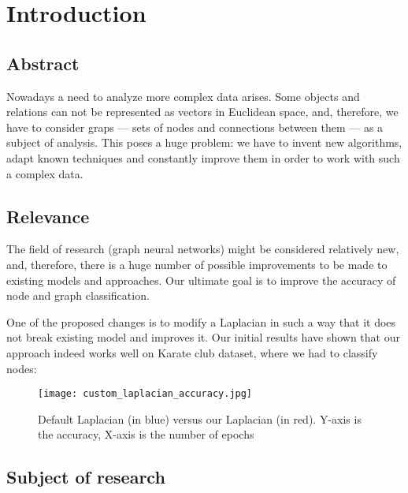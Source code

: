 \section{Introduction}

\subsection{Abstract}
    Nowadays a need to analyze more complex data arises.
    Some objects and relations can not be represented as vectors in Euclidean space, and, therefore, we have to consider graps --- sets of nodes and connections between them --- as a subject of analysis.
    This poses a huge problem: we have to invent new algorithms, adapt known techniques and constantly improve them in order to work with such a complex data.

\subsection{Relevance}
    The field of research (graph neural networks) might be considered relatively new, and, therefore, there is a huge number of possible improvements to be made to existing models and approaches.
    Our ultimate goal is to improve the accuracy of node and graph classification.

    One of the proposed changes is to modify a Laplacian in such a way that it does not break existing model and improves it.
    Our initial results have shown that our approach indeed works well on Karate club dataset, where we had to classify nodes:

    \begin{figure}[h]
        \centering
        \texttt{[image: custom\_laplacian\_accuracy.jpg]}
        \caption{Default Laplacian (in blue) versus our Laplacian (in red). Y-axis is the accuracy, X-axis is the number of epochs}
    \end{figure}

\subsection{Subject of research}


